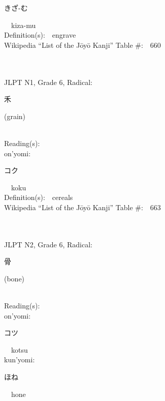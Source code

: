 \begin{multicols}{2}
{\hspace*{2em}}{\begin{CJK}{UTF8}{min} きざ-む \end{CJK}}\ \ kiza-mu\ \ \\
Definition(s):\ \ engrave \\
Wikipedia ``List of the J\=oy\=o Kanji'' Table \#:\ \ 660 \\
\ \ \\
{\fontsize{34pt}{40pt}  }\ \ \\  %
{JLPT N1, Grade 6, Radical:\ \ {\begin{CJK}{UTF8}{min} 禾 \end{CJK}} (grain) } \\
Reading(s):\ \ \\
{\hspace*{1em}}on'yomi:\ \ \\
{\hspace*{2em}}{\begin{CJK}{UTF8}{min} コク \end{CJK}}\ \ koku\ \ \\
Definition(s):\ \ cereals \\
Wikipedia ``List of the J\=oy\=o Kanji'' Table \#:\ \ 663 \\
\ \ \\
{\fontsize{34pt}{40pt}  }\ \ \\  %
{JLPT N2, Grade 6, Radical:\ \ {\begin{CJK}{UTF8}{min} 骨 \end{CJK}} (bone) } \\
Reading(s):\ \ \\
{\hspace*{1em}}on'yomi:\ \ \\
{\hspace*{2em}}{\begin{CJK}{UTF8}{min} コツ \end{CJK}}\ \ kotsu\ \ \\
{\hspace*{1em}}kun'yomi:\ \ \\
{\hspace*{2em}}{\begin{CJK}{UTF8}{min} ほね \end{CJK}}\ \ hone\ \ \\

\end{multicols}
